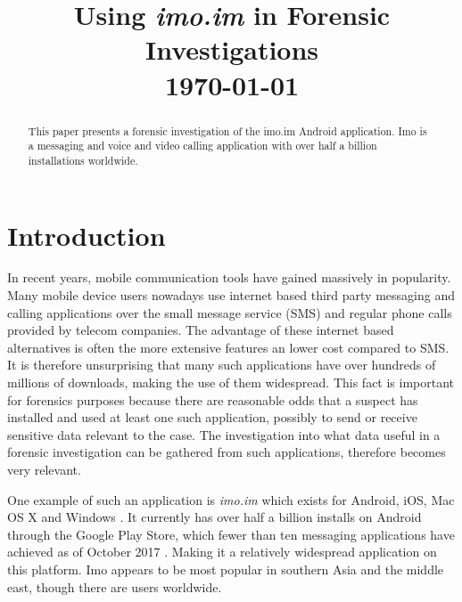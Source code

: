 \documentclass[conference]{IEEEtran}
\begin{document}
\title{Using {\it imo.im} in Forensic Investigations \\\vspace{5mm} \large  \today}
\author{
\and
{}
}
\maketitle
\thispagestyle{plain}
\pagestyle{plain}

\begin{abstract}
    This paper presents a forensic investigation of the imo.im Android
    application. Imo is a messaging and voice and video calling application with
    over half a billion installations worldwide. %
\end{abstract}

\section{Introduction}

In recent years, mobile communication tools have gained massively in popularity.
Many mobile device users nowadays use internet based third party messaging and
calling applications over the small message service (SMS) and regular phone
calls provided by telecom companies.  The advantage of these internet based
alternatives is often the more extensive features an lower cost compared to SMS.
It is therefore unsurprising that many such applications have over hundreds of
millions of downloads, making the use of them widespread. This fact is important
for forensics purposes because there are reasonable odds that a suspect has
installed and used at least one such application, possibly to send or receive
sensitive data relevant to the case. The investigation into what data useful in
a forensic investigation can be gathered from such applications, therefore
becomes very relevant.

One example of such an application is {\it imo.im} which exists for Android,
iOS, Mac OS X and Windows \cite{imo}. It currently has over half a billion
installs on Android through the Google Play Store, which fewer than ten
messaging applications have achieved as of October 2017
\cite{wiki-gplay-popular}. Making it a relatively widespread application on this
platform. Imo appears to be most popular in southern Asia and the middle east,
though there are users worldwide\footnotemark.
\end{document}
